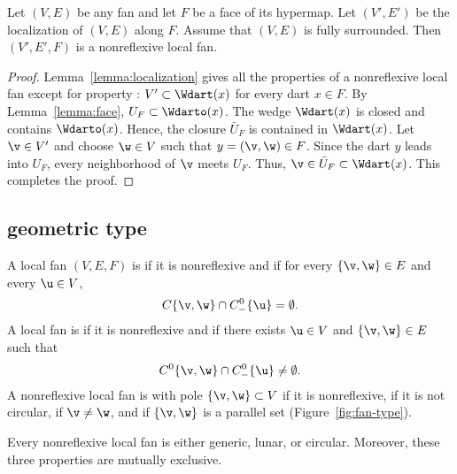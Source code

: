 \begin{lemma}[]\cutrate{}\label{lemma:localize-nonreflexive} 
Let $(V,E)$ be any fan and
  let $F$ be a face of its hypermap.  Let $(V',E')$ be the
  localization of $(V,E)$ along $F$.  Assume that $(V,E)$ is fully surrounded.
  Then $(V',E',F)$ is a nonreflexive local fan.
\end{lemma}

\begin{proof}
  Lemma~\ref{lemma:localization} gives all the properties of a
  nonreflexive local fan except for property : $V'\subset
  \Wdart(x)$ for every dart $x\in F$.  By Lemma~\ref{lemma:face}, $U_F
  \subset \Wdarto(x)$.  The wedge $\Wdart(x)$ is closed and contains
  $\Wdarto(x)$. Hence, the closure $\bar U_F$ is contained in
  $\Wdart(x)$.  Let $\v\in V'$ and choose $\w\in V$ such that
  $y=(\v,\w)\in F$.
  Since the dart $y$ leads into $U_F$, every neighborhood of $\v$
  meets $U_F$.  Thus, $\v\in \bar U_F\subset \Wdart(x)$.  This
  completes the proof.
\end{proof}


\subsection{geometric type}\label{sec:types}

\begin{definition}
A local fan $(V,E,F)$ is   
if it is nonreflexive and if for every $\{\v,\w\}\in E$
and every $\u\in V$, 
\[ 
C\{\v,\w\}\cap C^0_-\{\u\} = \emptyset.
\] 
A  local fan is  if it is nonreflexive and if there
exists $\u\in V$ and $\{\v,\w\}\in E$ such that
\[ 
C^0\{\v,\w\}\cap C^0_-\{\u\}\ne \emptyset.
\] 
A nonreflexive local fan is  with pole
$\{\v,\w\} \subset V$ if it is nonreflexive, if it is not circular, if $\v\ne\w$, and if
$\{\v,\w\}$ is a parallel set (Figure~\ref{fig:fan-type}).
\end{definition}
%
%
%

\figQTCGYTB %


\begin{lemma}[trichotomy]%
Every nonreflexive local fan is either
generic, lunar, or circular.  Moreover, these three properties are
mutually exclusive.
\end{lemma}
%
%
%
%
%

